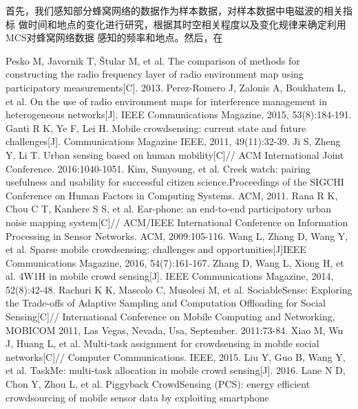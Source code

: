 \documentclass[UTF8]{ctexart}
\begin{document}
首先，我们感知部分蜂窝网络的数据作为样本数据，对样本数据中电磁波的相关指标
做时间和地点的变化进行研究，根据其时空相关程度以及变化规律来确定利用MCS对蜂窝网络数据
感知的频率和地点。然后，在












\begin{thebibliography}{99}
   Pesko M, Javornik T, Štular M, et al. The comparison of methods for constructing the radio frequency layer of radio environment
  map using participatory measurements[C]. 2013.
   Perez-Romero J, Zalonis A, Boukhatem L, et al. On the use of radio environment maps for interference management in heterogeneous
  networks[J]. IEEE Communications Magazine, 2015, 53(8):184-191.
   Ganti R K, Ye F, Lei H. Mobile crowdsensing: current state and future challenges[J]. Communications Magazine IEEE, 2011, 49(11):32-39.
   Ji S, Zheng Y, Li T. Urban sensing based on human mobility[C]// ACM International Joint Conference. 2016:1040-1051.
   Kim, Sunyoung, et al. Creek watch: pairing usefulness and usability for successful citizen science.Proceedings of the SIGCHI
  Conference on Human Factors in Computing Systems. ACM, 2011.
   Rana R K, Chou C T, Kanhere S S, et al. Ear-phone: an end-to-end participatory urban noise mapping system[C]// ACM/IEEE International
  Conference on Information Processing in Sensor Networks. ACM, 2009:105-116.
   Wang L, Zhang D, Wang Y, et al. Sparse mobile crowdsensing: challenges and opportunities[J]IEEE Communications Magazine, 2016, 54(7):161-167.
   Zhang D, Wang L, Xiong H, et al. 4W1H in mobile crowd sensing[J]. IEEE Communications Magazine, 2014, 52(8):42-48.
   Rachuri K K, Mascolo C, Musolesi M, et al. SociableSense: Exploring the Trade-offs of Adaptive Sampling and Computation Offloading for Social
  Sensing[C]// International Conference on Mobile Computing and Networking, MOBICOM 2011, Las Vegas, Nevada, Usa, September. 2011:73-84.
   Xiao M, Wu J, Huang L, et al. Multi-task assignment for crowdsensing in mobile social networks[C]// Computer Communications. IEEE, 2015.
   Liu Y, Guo B, Wang Y, et al. TaskMe: multi-task allocation in mobile crowd sensing[J]. 2016.
   Lane N D, Chon Y, Zhou L, et al. Piggyback CrowdSensing (PCS): energy efficient crowdsourcing of mobile sensor data by exploiting smartphone

\end{thebibliography}
\end{document}
